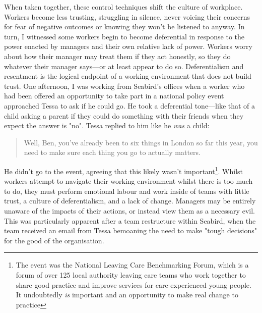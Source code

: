 When taken together, these control techniques shift the culture of workplace. Workers become less trusting, struggling in silence, never voicing their concerns for fear of negative outcomes or knowing they won’t be listened to anyway. In turn, I witnessed some workers begin to become deferential in response to the power enacted by managers and their own relative lack of power. Workers worry about how their manager may treat them if they act honestly, so they do whatever their manager says—or at least appear to do so. Deferentialism and resentment is the logical endpoint of a working environment that does not build trust. One afternoon, I was working from Seabird’s offices when a worker who had been offered an opportunity to take part in a national policy event approached Tessa to ask if he could go. He took a deferential tone—like that of a child asking a parent if they could do something with their friends when they expect the answer is "no". Tessa replied to him like he \textit{was} a child:
\begin{quote}
Well, Ben, you've already been to six things in London so far this year, you need to make sure each thing you go to actually matters.
\end{quote}
He didn’t go to the event, agreeing that this likely wasn't important\footnote{The event was the National Leaving Care Benchmarking Forum, which is a forum of over 125 local authority leaving care teams who work together to share good practice and improve services for care-experienced young people. It undoubtedly \textit{is} important and an opportunity to make real change to practice}. Whilst workers attempt to navigate their working environment whilst there is too much to do, they must perform emotional labour and work inside of teams with little trust, a culture of deferentialism, and a lack of change. Managers may be entirely  unaware of the impacts of their actions, or instead view them as a necessary evil. This was particularly apparent after a team restructure within Seabird, when the team received an email from Tessa bemoaning the need to make "tough decisions" for the good of the organisation.

